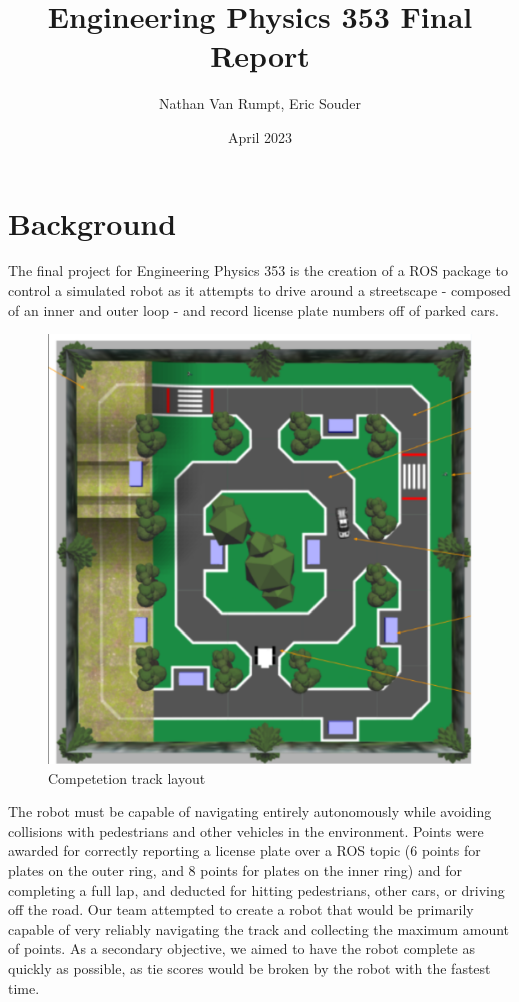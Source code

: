 \documentclass[titlepage, twocolumn]{article}
\newcommand{\subtitle}[1]{%
  \posttitle{%
    \par\end{center}
    \begin{center}\large#1\end{center}
    \vskip0.5em}%
}
\begin{document}
\title{Engineering Physics 353 Final Report}
\subtitle{Team 14 - ``Team 4"}
\author{Nathan Van Rumpt, Eric Souder}
\date{April 2023}

\maketitle

\section{Background}

    The final project for Engineering Physics 353 is the creation of a ROS package to control a simulated robot as it attempts to drive around a streetscape - composed of an inner and outer loop - and record license plate numbers off of parked cars. 
    
    \begin{figure}[H]
    \centering
    \includegraphics[width=\linewidth]{Competition Space.png}
    \caption{Competetion track layout}
    \label{fig:label}
    \end{figure}
    
    The robot must be capable of navigating entirely autonomously while avoiding collisions with pedestrians and other vehicles in the environment. Points were awarded for correctly reporting a license plate over a ROS topic (6 points for plates on the outer ring, and 8 points for plates on the inner ring) and for completing a full lap, and deducted for hitting pedestrians, other cars, or driving off the road. Our team attempted to create a robot that would be primarily capable of very reliably navigating the track and collecting the maximum amount of points. As a secondary objective, we aimed to have the robot complete as quickly as possible, as tie scores would be broken by the robot with the fastest time.
\end{document}
